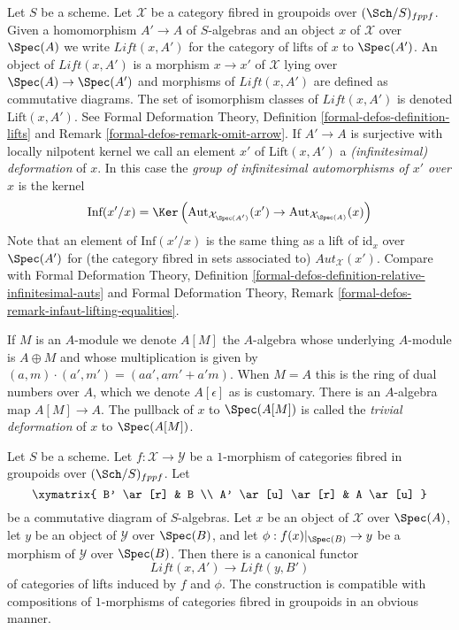 \medskip\noindent
Let $S$ be a scheme. Let $\mathcal{X}$ be a category fibred in groupoids
over $(\Sch/S)_{fppf}$. Given a homomorphism $A' \to A$ of $S$-algebras
and an object $x$ of $\mathcal{X}$ over $\Spec(A)$ we write
$\textit{Lift}(x, A')$ for the category of lifts of $x$ to $\Spec(A')$.
An object of $\textit{Lift}(x, A')$ is a morphism $x \to x'$ of $\mathcal{X}$
lying over $\Spec(A) \to \Spec(A')$ and morphisms of $\textit{Lift}(x, A')$
are defined as commutative diagrams. The set of isomorphism classes of
$\textit{Lift}(x, A')$ is denoted $\text{Lift}(x, A')$. See
Formal Deformation Theory, Definition \ref{formal-defos-definition-lifts} and
Remark \ref{formal-defos-remark-omit-arrow}.
If $A' \to A$ is surjective with locally nilpotent kernel we call an element
$x'$ of $\text{Lift}(x, A')$ a {\it (infinitesimal) deformation} of $x$.
In this case the {\it group of infinitesimal automorphisms of $x'$ over $x$}
is the kernel
$$
\text{Inf}(x'/x) =
\Ker\left(
\text{Aut}_{\mathcal{X}_{\Spec(A')}}(x') \to
\text{Aut}_{\mathcal{X}_{\Spec(A)}}(x)\right)
$$
Note that an element of $\text{Inf}(x'/x)$ is the same thing as a lift
of $\text{id}_x$ over $\Spec(A')$ for (the category fibred in sets associated
to) $\mathit{Aut}_\mathcal{X}(x')$. Compare with
Formal Deformation Theory, Definition
\ref{formal-defos-definition-relative-infinitesimal-auts} and
Formal Deformation Theory, Remark
\ref{formal-defos-remark-infaut-lifting-equalities}.

\medskip\noindent
If $M$ is an $A$-module we denote $A[M]$ the $A$-algebra whose underlying
$A$-module is $A \oplus M$ and whose multiplication is given by
$(a, m) \cdot (a', m') = (aa', am' + a'm)$. When $M = A$ this is the ring
of dual numbers over $A$, which we denote $A[\epsilon]$ as is customary.
There is an $A$-algebra map $A[M] \to A$. The pullback of $x$ to $\Spec(A[M])$
is called the {\it trivial deformation} of $x$ to $\Spec(A[M])$.

\begin{lemma}
\label{lemma-functoriality}
Let $S$ be a scheme. Let $f : \mathcal{X} \to \mathcal{Y}$ be a $1$-morphism
of categories fibred in groupoids over $(\Sch/S)_{fppf}$. Let
$$
\xymatrix{
B' \ar[r] & B \\
A' \ar[u] \ar[r] & A \ar[u]
}
$$
be a commutative diagram of $S$-algebras. Let $x$ be an object of $\mathcal{X}$
over $\Spec(A)$, let $y$ be an object of $\mathcal{Y}$ over $\Spec(B)$,
and let $\phi : f(x)|_{\Spec(B)} \to y$ be a morphism of $\mathcal{Y}$
over $\Spec(B)$. Then there is a canonical functor
$$
\textit{Lift}(x, A') \longrightarrow \textit{Lift}(y, B')
$$
of categories of lifts induced by $f$ and $\phi$. The construction is
compatible with compositions of $1$-morphisms of categories fibred in
groupoids in an obvious manner.
\end{lemma}

